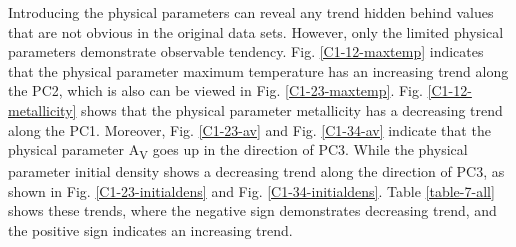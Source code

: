 \documentclass{aa}
\begin{document}
\begin{CJK*}{UTF8}{gbsn}
    Introducing the physical parameters can reveal any trend hidden behind values that are not obvious in the original data sets. 
    However, only the limited physical parameters demonstrate observable tendency. 
    Fig. \ref{C1-12-maxtemp} indicates that the physical parameter maximum temperature has an increasing trend along the PC2, which is also can be viewed in Fig. \ref{C1-23-maxtemp}. 
    Fig. \ref{C1-12-metallicity} shows that the physical parameter metallicity has a decreasing trend along the PC1. 
    Moreover, Fig. \ref{C1-23-av} and Fig. \ref{C1-34-av} indicate that the physical parameter A\textsubscript{V} goes up in the direction of PC3.
    While the physical parameter initial density shows a decreasing trend along the direction of PC3, as shown in Fig. \ref{C1-23-initialdens} and Fig. \ref{C1-34-initialdens}. 
    Table \ref{table-7-all} shows these trends, where the negative sign demonstrates decreasing trend, and the positive sign indicates an increasing trend. 
 \begin{figure}[htbp]
\centering
{}
\end{figure}
\end{CJK*}
\end{document}
